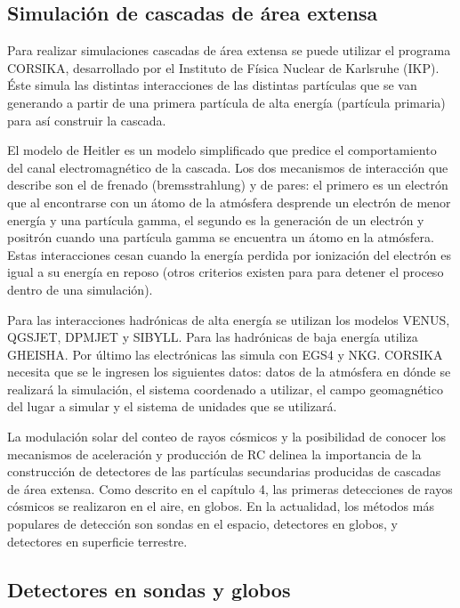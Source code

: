 \documentclass{book}
\begin{document}
\subsection{Simulaci\'on de cascadas de \'area extensa}
Para realizar simulaciones cascadas de área extensa se puede utilizar el programa CORSIKA, desarrollado por el Instituto de Física Nuclear de Karlsruhe (IKP). Éste simula las distintas interacciones de las distintas partículas que se van generando a partir de una primera partícula de alta energía (partícula primaria) para así construir la cascada. \citep{HECK}

El modelo de Heitler es un modelo simplificado que predice el comportamiento del canal electromagnético de la cascada. Los dos mecanismos de interacción que describe son el de frenado (bremsstrahlung) y de pares: el primero es un electrón que al encontrarse con un átomo de la atmósfera desprende un electrón de menor energía y una partícula gamma, el segundo es la generación de un electrón y positrón cuando una partícula gamma se encuentra un átomo en la atmósfera. Estas interacciones cesan cuando la energía perdida por ionización del electrón es igual a su energía en reposo (otros criterios existen para para detener el proceso dentro de una simulación). \citep{SUAREZ}

Para las interacciones hadrónicas de alta energía se utilizan los modelos VENUS, QGSJET, DPMJET y SIBYLL. Para las hadrónicas de baja energía utiliza GHEISHA. Por último las electrónicas las simula con EGS4 y NKG. CORSIKA necesita que se le ingresen los siguientes datos: datos de la atmósfera en dónde se realizará la simulación, el sistema coordenado a utilizar, el campo geomagnético del lugar a simular y el sistema de unidades que se utilizará. \citep{HECK}

La modulaci\'on solar del conteo de rayos c\'osmicos y la posibilidad de conocer los mecanismos de aceleraci\'on y producci\'on de RC delinea la importancia de la construcci\'on de detectores de las part\'iculas secundarias producidas de cascadas de \'area extensa. Como descrito en el cap\'itulo 4, las primeras detecciones de rayos c\'osmicos se realizaron en el aire, en globos. En la actualidad, los  m\'etodos m\'as populares de detecci\'on son sondas en el espacio, detectores en globos, y detectores en superficie terrestre. \citep{BERN}

\subsection{Detectores en sondas y globos}
\end{document}
